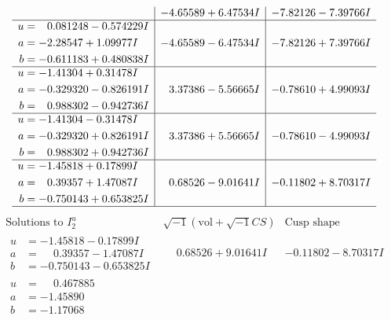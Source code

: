 \documentclass[1p]{elsarticle_modified}
\theoremstyle{definition}
\newcommand{\I}{\sqrt{-1}}
\begin{document}
$$\begin{array}{c|c|c}
 & -4.65589 + 6.47534 I & -7.82126 - 7.39766 I \\ \hline\begin{aligned}
u &= \phantom{-}0.081248 - 0.574229 I \\
a &= -2.28547 + 1.09977 I \\
b &= -0.611183 + 0.480838 I\end{aligned}
 & -4.65589 - 6.47534 I & -7.82126 + 7.39766 I \\ \hline\begin{aligned}
u &= -1.41304 + 0.31478 I \\
a &= -0.329320 - 0.826191 I \\
b &= \phantom{-}0.988302 - 0.942736 I\end{aligned}
 & \phantom{-}3.37386 - 5.56665 I & -0.78610 + 4.99093 I \\ \hline\begin{aligned}
u &= -1.41304 - 0.31478 I \\
a &= -0.329320 + 0.826191 I \\
b &= \phantom{-}0.988302 + 0.942736 I\end{aligned}
 & \phantom{-}3.37386 + 5.56665 I & -0.78610 - 4.99093 I \\ \hline\begin{aligned}
u &= -1.45818 + 0.17899 I \\
a &= \phantom{-}0.39357 + 1.47087 I \\
b &= -0.750143 + 0.653825 I\end{aligned}
 & \phantom{-}0.68526 - 9.01641 I & -0.11802 + 8.70317 I\\
 \hline 
 \end{array}$$\newpage$$\begin{array}{c|c|c}  
\text{Solutions to }I^u_{2}& \I (\text{vol} + \sqrt{-1}CS) & \text{Cusp shape}\\
 \hline 
\begin{aligned}
u &= -1.45818 - 0.17899 I \\
a &= \phantom{-}0.39357 - 1.47087 I \\
b &= -0.750143 - 0.653825 I\end{aligned}
 & \phantom{-}0.68526 + 9.01641 I & -0.11802 - 8.70317 I \\ \hline\begin{aligned}
u &= \phantom{-}0.467885\phantom{ +0.000000I} \\
a &= -1.45890\phantom{ +0.000000I} \\
b &= -1.17068\phantom{ +0.000000I}\end{aligned}

\end{array}$$
\end{document}
